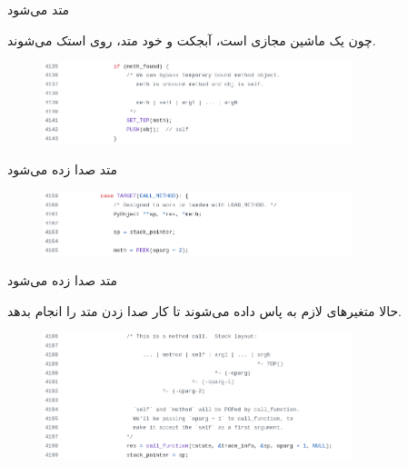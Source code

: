 \begin{frame}[fragile]{متد  می‌شود}
\begin{flushright}
چون 
یک ماشین مجازی  است، آبجکت 
و خود متد، روی استک
می‌شوند.
\end{flushright}
\begin{figure}[H]
\begin{center}
\includegraphics[width=0.8\textwidth, height=0.4\textheight]{docs/images/load-2}
\end{center}
\end{figure}
\end{frame}

\begin{frame}{متد صدا زده می‌شود}
\begin{figure}[H]
\begin{center}
\includegraphics[width=0.8\textwidth, height=0.3\textheight]{docs/images/call-1}
\end{center}
\end{figure}
\end{frame}

\begin{frame}{متد صدا زده می‌شود}
\begin{flushright}
حالا متغیر‌های لازم به 
پاس داده می‌شوند تا کار صدا زدن متد را انجام بدهد.
\end{flushright}
\begin{figure}[H]
\begin{center}
\includegraphics[width=0.8\textwidth, height=0.65\textheight]{docs/images/call-2}
\end{center}
\end{figure}
\end{frame}

